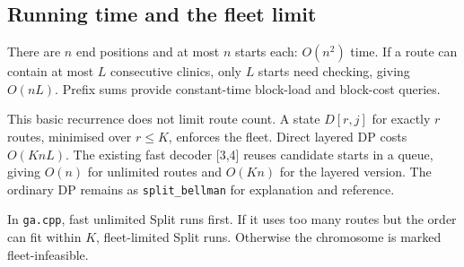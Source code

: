 \subsection*{Running time and the fleet limit}
There are $n$ end positions and at most $n$ starts each: $O(n^2)$ time. If a route can contain at
most $L$ consecutive clinics, only $L$ starts need checking, giving $O(nL)$. Prefix sums provide
constant-time block-load and block-cost queries.

This basic recurrence does not limit route count. A state $D[r,j]$ for exactly $r$ routes,
minimised over $r\le K$, enforces the fleet. Direct layered DP costs $O(KnL)$.
The existing fast decoder [3,4] reuses candidate starts in a queue, giving $O(n)$ for unlimited
routes and $O(Kn)$ for the layered version. The ordinary DP remains as \texttt{split\_bellman}
for explanation and reference.

In \texttt{ga.cpp}, fast unlimited Split runs first. If it uses too many routes but the order
can fit within $K$, fleet-limited Split runs. Otherwise the chromosome is marked fleet-infeasible.
